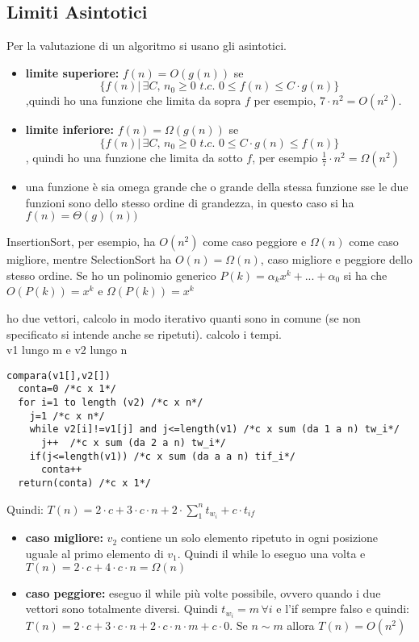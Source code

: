\documentclass[a4paper,12pt,oneside,tikz]{book}
\begin{document}
\subsection{Limiti Asintotici}
Per la valutazione di un algoritmo si usano gli asintotici.

\begin{itemize}
\item \textbf{limite superiore:} $f(n)=O(g(n))$ se $$\{f(n)|\,\exists C,\, n_0\geq 0\, \, t.c.\,\, 0\leq f(n)\leq C\cdot g(n)\}$$,quindi ho una funzione che limita da sopra $f$ per esempio, $7\cdot n^2=O(n^2)$.\\

\item \textbf{limite inferiore:} $f(n)=\Omega(g(n))$ se $$\{f(n)|\,\exists C,\, n_0\geq 0\, \, t.c.\,\, 0  \leq C\cdot g(n)\leq f(n)\}$$, quindi ho una funzione che limita da sotto $f$, per esempio $\frac{1}{7}\cdot n^2=\Omega(n^2)$
\item  una funzione è sia omega grande che o grande della stessa funzione sse le due funzioni sono dello stesso ordine di grandezza, in questo caso si ha $f(n)=\Theta(g)(n))$
\end{itemize}
InsertionSort, per esempio, ha $O(n^2)$ come caso peggiore e $\Omega(n)$ come caso migliore, mentre SelectionSort ha $O(n)=\Omega(n)$, caso migliore e peggiore dello stesso ordine.
Se ho un polinomio generico $P(k)=\alpha_k x^k+...+\alpha_0$ si ha che $O(P(k))=x^k$ e $\Omega (P(k))=x^k$
\newpage
\begin{esercizio}
ho due vettori, calcolo in modo iterativo quanti sono in comune (se non specificato si intende anche se ripetuti). calcolo i tempi.\\
v1 lungo m e v2 lungo n
\begin{verbatim}
compara(v1[],v2[])
  conta=0 /*c x 1*/
  for i=1 to length (v2) /*c x n*/
    j=1 /*c x n*/
    while v2[i]!=v1[j] and j<=length(v1) /*c x sum (da 1 a n) tw_i*/
      j++  /*c x sum (da 2 a n) tw_i*/
    if(j<=length(v1)) /*c x sum (da a a n) tif_i*/
      conta++
  return(conta) /*c x 1*/
\end{verbatim}
Quindi: $T(n)=2\cdot c+ 3\cdot c\cdot n+ 2\cdot\sum_1^nt_{w_i}+c\cdot t_{if}$
\begin{itemize}
\item \textbf{caso migliore:} $v_2$ contiene un solo elemento ripetuto in ogni posizione uguale al primo elemento di $v_1$. Quindi il while lo eseguo una volta e $T(n)=2\cdot c+4\cdot c\cdot n=\Omega(n)$
\item \textbf{caso peggiore:} eseguo il while più volte possibile, ovvero quando i due vettori sono totalmente diversi. Quindi $t_{w_i}=m\, \forall i$ e l'if sempre falso e quindi: $T(n)=2\cdot c+ 3\cdot c\cdot n+ 2\cdot c\cdot n\cdot m +c\cdot 0$. Se $n\sim m$ allora $T(n)=O(n^2)$
\end{itemize}
\end{esercizio}
\end{document}
